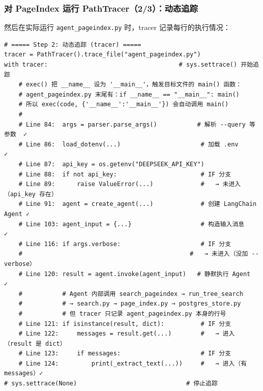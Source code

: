 \documentclass[presentation,aspectratio=169]{ctexbeamer}
\begin{document}
\begin{frame}[fragile]
\frametitle{对 PageIndex 运行 PathTracer（2/3）：动态追踪}
{\scriptsize 然后在实际运行 \texttt{agent\_pageindex.py} 时，tracer 记录每行的执行情况：}

\vspace{0.05cm}
{\tiny
\begin{verbatim}
# ===== Step 2: 动态追踪 (tracer) =====
tracer = PathTracer().trace_file("agent_pageindex.py")
with tracer:                                    # sys.settrace() 开始追踪
    # exec() 把 __name__ 设为 '__main__'，触发目标文件的 main() 函数：
    # agent_pageindex.py 末尾有：if __name__ == "__main__": main()
    # 所以 exec(code, {'__name__':'__main__'}) 会自动调用 main()
    #
    # Line 84:  args = parser.parse_args()           # 解析 --query 等参数  ✓
    # Line 86:  load_dotenv(...)                      # 加载 .env           ✓
    # Line 87:  api_key = os.getenv("DEEPSEEK_API_KEY")
    # Line 88:  if not api_key:                       # IF 分支
    # Line 89:      raise ValueError(...)             #   → 未进入（api_key 存在）
    # Line 91:  agent = create_agent(...)             # 创建 LangChain Agent ✓
    # Line 103: agent_input = {...}                   # 构造输入消息          ✓
    # Line 116: if args.verbose:                      # IF 分支
    #                                              #   → 未进入（没加 --verbose）
    # Line 120: result = agent.invoke(agent_input)   # 静默执行 Agent        ✓
    #           # Agent 内部调用 search_pageindex → run_tree_search
    #           # → search.py → page_index.py → postgres_store.py
    #           # 但 tracer 只记录 agent_pageindex.py 本身的行号
    # Line 121: if isinstance(result, dict):          # IF 分支
    # Line 122:     messages = result.get(...)        #   → 进入（result 是 dict）
    # Line 123:     if messages:                      # IF 分支
    # Line 124:         print(_extract_text(...))     #   → 进入（有 messages）✓
# sys.settrace(None)                              # 停止追踪
\end{verbatim}}
\end{frame}

\end{document}

